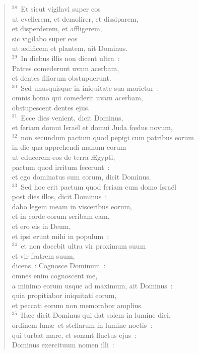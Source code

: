 \begin{flushleft}
\begin{verse}
${}^{28}$~Et sicut vigilavi super eos\\ ut evellerem, et demolirer, et dissiparem,\\ et disperderem, et affligerem,\\ sic vigilabo super eos\\ ut \ae dificem et plantem, ait Dominus.\\
${}^{29}$~In diebus illis non dicent ultra~:\\ Patres comederunt uvam acerbam,\\ et dentes filiorum obstupuerunt.\\
${}^{30}$~Sed unusquisque in iniquitate sua morietur~:\\ omnis homo qui comederit uvam acerbam,\\ obstupescent dentes ejus.\\
${}^{31}$~Ecce dies venient, dicit Dominus,\\ et feriam domui Isra\"el et domui Juda fœdus novum,\\
${}^{32}$~non secundum pactum quod pepigi cum patribus eorum\\ in die qua apprehendi manum eorum\\ ut educerem eos de terra \AE gypti,\\ pactum quod irritum fecerunt~:\\ et ego dominatus sum eorum, dicit Dominus.\\
${}^{33}$~Sed hoc erit pactum quod feriam cum domo Isra\"el\\ post dies illos, dicit Dominus~:\\ dabo legem meam in visceribus eorum,\\ et in corde eorum scribam eam,\\ et ero eis in Deum,\\ et ipsi erunt mihi in populum~:\\
${}^{34}$~et non docebit ultra vir proximum suum\\ et vir fratrem suum,\\ dicens~: Cognosce Dominum~:\\ omnes enim cognoscent me,\\ a minimo eorum usque ad maximum, ait Dominus~:\\ quia propitiabor iniquitati eorum,\\ et peccati eorum non memorabor amplius.\\
${}^{35}$~H\ae c dicit Dominus qui dat solem in lumine diei,\\ ordinem lun\ae\ et stellarum in lumine noctis~:\\ qui turbat mare, et sonant fluctus ejus~:\\ Dominus exercituum nomen illi~:\\

\end{verse}
\end{flushleft}
